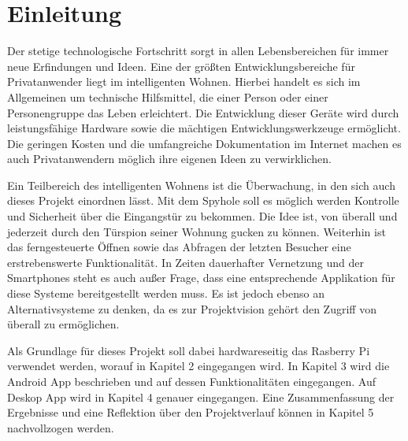 
\chapter{Einleitung}
Der stetige technologische Fortschritt sorgt in allen Lebensbereichen für immer neue Erfindungen und Ideen. Eine der größten Entwicklungsbereiche für Privatanwender liegt im intelligenten Wohnen. Hierbei handelt es sich im Allgemeinen um technische Hilfsmittel, die einer Person oder einer Personengruppe das Leben erleichtert. Die Entwicklung dieser Geräte wird durch leistungsfähige Hardware sowie die mächtigen Entwicklungswerkzeuge ermöglicht. Die geringen Kosten und die umfangreiche Dokumentation im Internet machen es auch Privatanwendern möglich ihre eigenen Ideen zu verwirklichen.  
\par
Ein Teilbereich des intelligenten Wohnens ist die Überwachung, in den sich auch dieses Projekt einordnen lässt. Mit dem Spyhole soll es möglich werden Kontrolle und Sicherheit über die Eingangstür zu bekommen. Die Idee ist, von überall und jederzeit durch den Türspion seiner Wohnung gucken zu können. Weiterhin ist das ferngesteuerte Öffnen sowie das Abfragen der letzten Besucher eine erstrebenswerte Funktionalität. In Zeiten dauerhafter Vernetzung und der Smartphones steht es auch außer Frage, dass eine entsprechende Applikation für diese Systeme bereitgestellt werden muss. Es ist jedoch ebenso an Alternativsysteme zu denken, da es zur Projektvision gehört den Zugriff von überall zu ermöglichen. 
\par
Als Grundlage für dieses Projekt soll dabei hardwareseitig das Rasberry Pi verwendet werden, worauf in Kapitel 2 eingegangen wird. In Kapitel 3 wird die Android App beschrieben und auf dessen Funktionalitäten eingegangen. Auf Deskop App wird in Kapitel 4 genauer eingegangen. Eine Zusammenfassung der Ergebnisse und eine Reflektion über den Projektverlauf können in Kapitel 5 nachvollzogen werden. 
